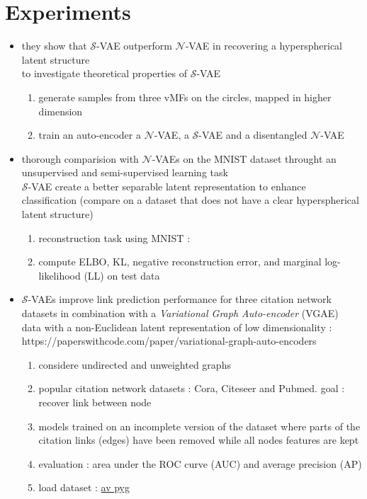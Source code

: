 \documentclass[12pt]{article}
\newcommand{\n}{\mathcal{N}} %
\newcommand{\Ss}{\mathcal{S}} %
\begin{document}
\section{Experiments}

\begin{itemize}
    \item they show that $\mathcal{S}$-VAE outperform $\mathcal{N}$-VAE in recovering a hyperspherical latent structure \\ 
        to investigate theoretical properties of $\mathcal{S}$-VAE \\ 
        \begin{enumerate}
            \item generate samples from three vMFs on the circles, mapped in higher dimension 
            \item train an auto-encoder a $\n$-VAE, a $\Ss$-VAE and a disentangled $\n$-VAE
        \end{enumerate}
    \item thorough comparision with $\mathcal{N}$-VAEs on the MNIST dataset throught an unsupervised and semi-supervised learning task \\
            $\mathcal{S}$-VAE create a better separable latent representation to enhance classification
            (compare on a dataset that does not have a clear hyperspherical latent structure)
            \begin{enumerate}
                \item reconstruction task using MNIST : 
                \item compute ELBO, KL, negative reconstruction error, and marginal log-likelihood (LL) on test data
            \end{enumerate}
                
    \item $\mathcal{S}$-VAEs improve link prediction performance for three citation network datasets in combination with a \textit{Variational Graph Auto-encoder} (VGAE) \\
            data with a non-Euclidean latent representation of low dimensionality : https://paperswithcode.com/paper/variational-graph-auto-encoders 
            \begin{enumerate}
                \item considere undirected and unweighted graphs
                \item popular citation network datasets : Cora, Citeseer and Pubmed. goal : recover link between node
                \item models trained on an incomplete version of the dataset where parts of the citation links (edges) have been removed while all nodes features are kept
                \item evaluation : area under the ROC curve (AUC) and average precision (AP)
                \item load dataset : \href{https://pytorch-geometric.readthedocs.io/en/latest/generated/torch_geometric.datasets.Planetoid.html#torch_geometric.datasets.Planetoid}{av pyg}
            \end{enumerate}
\end{itemize}
\end{document}
